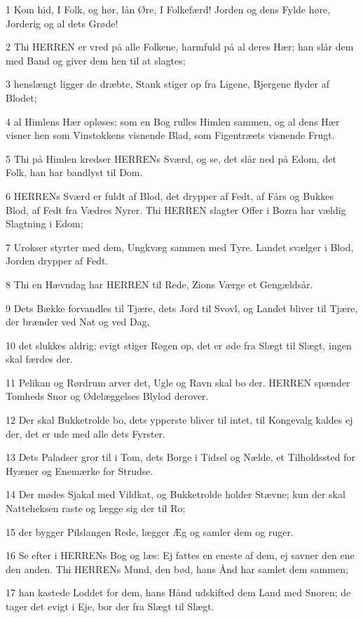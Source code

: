 \par 1 Kom hid, I Folk, og hør, lån Øre, I Folkefærd! Jorden og dens Fylde høre, Jorderig og al dets Grøde!
\par 2 Thi HERREN er vred på alle Folkene, harmfuld på al deres Hær; han slår dem med Band og giver dem hen til at slagtes;
\par 3 henslængt ligger de dræbte, Stank stiger op fra Ligene, Bjergene flyder af Blodet;
\par 4 al Himlens Hær opløses; som en Bog rulles Himlen sammen, og al dens Hær visner hen som Vinstokkens visnende Blad, som Figentræets visnende Frugt.
\par 5 Thi på Himlen kredser HERRENs Sværd, og se, det slår ned på Edom, det Folk, han har bandlyst til Dom.
\par 6 HERRENs Sværd er fuldt af Blod, det drypper af Fedt, af Fårs og Bukkes Blod, af Fedt fra Vædres Nyrer. Thi HERREN slagter Offer i Bozra har vældig Slagtning i Edom;
\par 7 Urokser styrter med dem, Ungkvæg sammen med Tyre. Landet svælger i Blod, Jorden drypper af Fedt.
\par 8 Thi en Hævndag har HERREN til Rede, Zions Værge et Gengældsår.
\par 9 Dets Bække forvandles til Tjære, dets Jord til Svovl, og Landet bliver til Tjære, der brænder ved Nat og ved Dag,
\par 10 det slukkes aldrig; evigt stiger Røgen op, det er øde fra Slægt til Slægt, ingen skal færdes der.
\par 11 Pelikan og Rørdrum arver det, Ugle og Ravn skal bo der. HERREN spænder Tomheds Snor og Ødelæggelses Blylod derover.
\par 12 Der skal Bukketrolde bo, dets ypperste bliver til intet, til Kongevalg kaldes ej der, det er ude med alle dets Fyrster.
\par 13 Dets Paladser gror til i Tom, dets Borge i Tidsel og Nælde, et Tilholdssted for Hyæner og Enemærke for Strudse.
\par 14 Der mødes Sjakal med Vildkat, og Bukketrolde holder Stævne; kun der skal Natteheksen raste og lægge sig der til Ro;
\par 15 der bygger Pilslangen Rede, lægger Æg og samler dem og ruger.
\par 16 Se efter i HERRENs Bog og læs: Ej fattes en eneste af dem, ej savner den ene den anden. Thi HERRENs Mund, den bød, hans Ånd har samlet dem sammen;
\par 17 han kastede Loddet for dem, hans Hånd udskifted dem Land med Snoren; de tager det evigt i Eje, bor der fra Slægt til Slægt.

